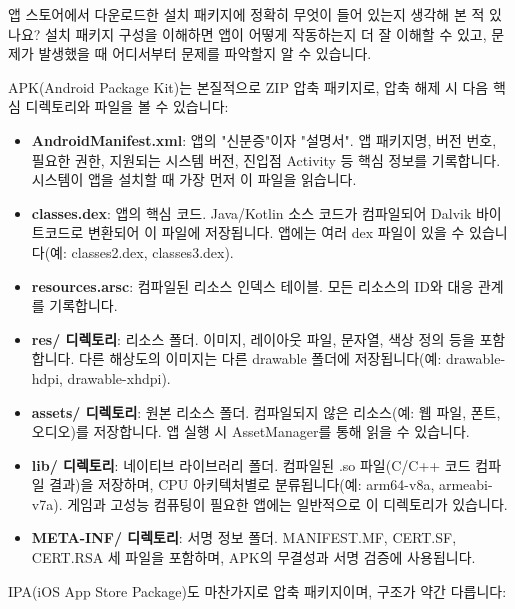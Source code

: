 
앱 스토어에서 다운로드한 설치 패키지에 정확히 무엇이 들어 있는지 생각해 본 적 있나요? 설치 패키지 구성을 이해하면 앱이 어떻게 작동하는지 더 잘 이해할 수 있고, 문제가 발생했을 때 어디서부터 문제를 파악할지 알 수 있습니다.


APK(Android Package Kit)는 본질적으로 ZIP 압축 패키지로, 압축 해제 시 다음 핵심 디렉토리와 파일을 볼 수 있습니다:

\begin{itemize}
  \item \textbf{AndroidManifest.xml}: 앱의 "신분증"이자 "설명서". 앱 패키지명, 버전 번호, 필요한 권한, 지원되는 시스템 버전, 진입점 Activity 등 핵심 정보를 기록합니다. 시스템이 앱을 설치할 때 가장 먼저 이 파일을 읽습니다.
  \item \textbf{classes.dex}: 앱의 핵심 코드. Java/Kotlin 소스 코드가 컴파일되어 Dalvik 바이트코드로 변환되어 이 파일에 저장됩니다. 앱에는 여러 dex 파일이 있을 수 있습니다(예: classes2.dex, classes3.dex).
  \item \textbf{resources.arsc}: 컴파일된 리소스 인덱스 테이블. 모든 리소스의 ID와 대응 관계를 기록합니다.
  \item \textbf{res/ 디렉토리}: 리소스 폴더. 이미지, 레이아웃 파일, 문자열, 색상 정의 등을 포함합니다. 다른 해상도의 이미지는 다른 drawable 폴더에 저장됩니다(예: drawable-hdpi, drawable-xhdpi).
  \item \textbf{assets/ 디렉토리}: 원본 리소스 폴더. 컴파일되지 않은 리소스(예: 웹 파일, 폰트, 오디오)를 저장합니다. 앱 실행 시 AssetManager를 통해 읽을 수 있습니다.
  \item \textbf{lib/ 디렉토리}: 네이티브 라이브러리 폴더. 컴파일된 .so 파일(C/C++ 코드 컴파일 결과)을 저장하며, CPU 아키텍처별로 분류됩니다(예: arm64-v8a, armeabi-v7a). 게임과 고성능 컴퓨팅이 필요한 앱에는 일반적으로 이 디렉토리가 있습니다.
  \item \textbf{META-INF/ 디렉토리}: 서명 정보 폴더. MANIFEST.MF, CERT.SF, CERT.RSA 세 파일을 포함하며, APK의 무결성과 서명 검증에 사용됩니다.
\end{itemize}


IPA(iOS App Store Package)도 마찬가지로 압축 패키지이며, 구조가 약간 다릅니다:


